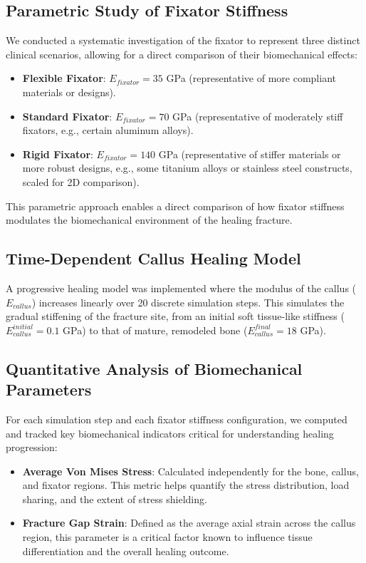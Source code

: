 \documentclass{article}
\begin{document}
\subsection{Parametric Study of Fixator Stiffness}
We conducted a systematic investigation of the fixator to represent three distinct clinical scenarios, allowing for a direct comparison of their biomechanical effects:
\begin{itemize}
  \item \textbf{Flexible Fixator}: $E_{fixator} = 35$ GPa (representative of more compliant materials or designs).
  \item \textbf{Standard Fixator}: $E_{fixator} = 70$ GPa (representative of moderately stiff fixators, e.g., certain aluminum alloys).
  \item \textbf{Rigid Fixator}: $E_{fixator} = 140$ GPa (representative of stiffer materials or more robust designs, e.g., some titanium alloys or stainless steel constructs, scaled for 2D comparison).
\end{itemize}
This parametric approach enables a direct comparison of how fixator stiffness modulates the biomechanical environment of the healing fracture.

\subsection{Time-Dependent Callus Healing Model}
A progressive healing model was implemented where the modulus of the callus ($E_{callus}$) increases linearly over 20 discrete simulation steps. This simulates the gradual stiffening of the fracture site, from an initial soft tissue-like stiffness ($E_{callus}^{initial} = 0.1$ GPa) to that of mature, remodeled bone ($E_{callus}^{final} = 18$ GPa).

\subsection{Quantitative Analysis of Biomechanical Parameters}
For each simulation step and each fixator stiffness configuration, we computed and tracked key biomechanical indicators critical for understanding healing progression:
\begin{itemize}
  \item \textbf{Average Von Mises Stress}: Calculated independently for the bone, callus, and fixator regions. This metric helps quantify the stress distribution, load sharing, and the extent of stress shielding.
  \item \textbf{Fracture Gap Strain}: Defined as the average axial strain across the callus region, this parameter is a critical factor known to influence tissue differentiation and the overall healing outcome.
\end{itemize}
\end{document}
